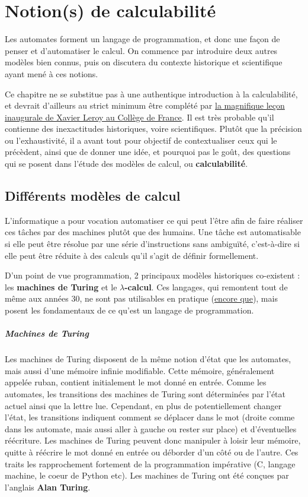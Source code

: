 
\chapter{Notion(s) de calculabilité}

Les automates forment un langage de programmation, et donc une façon de penser et d'automatiser le calcul. On commence par introduire deux autres modèles bien connus, puis on discutera du contexte historique et scientifique ayant mené à ces notions.

Ce chapitre ne se substitue pas à une authentique introduction à la calculabilité, et devrait d'ailleurs au strict minimum être complété par \href{https://www.college-de-france.fr/site/xavier-leroy/inaugural-lecture-2018-11-15-18h00.htm}{la magnifique leçon inaugurale de Xavier Leroy au Collège de France}. Il est très probable qu'il contienne des inexactitudes historiques, voire scientifiques. Plutôt que la précision ou l'exhaustivité, il a avant tout pour objectif de contextualiser ceux qui le précèdent, ainsi que de donner une idée, et pourquoi pas le goût, des questions qui se posent dans l'étude des modèles de calcul, ou \textbf{calculabilité}.

\section{Différents modèles de calcul}

L'informatique a pour vocation automatiser ce qui peut l'être afin de faire réaliser ces tâches par des machines plutôt que des humains. Une tâche est automatisable si elle peut être résolue par une série d'instructions sans ambiguïté, c'est-à-dire si elle peut être réduite à des calculs qu'il s'agit de définir formellement. 

D'un point de vue programmation, 2 principaux modèles historiques co-existent : les \textbf{machines de Turing} et le \textbf{$\lambda$-calcul}. Ces langages, qui remontent tout de même aux années 30, ne sont pas utilisables en pratique (\href{http://www.ens-lyon.fr/actualite/lecole/la-machine-de-turing-en-legos}{encore que}), mais posent les fondamentaux de ce qu'est un langage de programmation.

\paragraph{Machines de Turing} Les machines de Turing disposent de la même notion d'état que les automates, mais aussi d'une mémoire infinie modifiable. Cette mémoire, généralement appelée ruban, contient initialement le mot donné en entrée. Comme les automates, les transitions des machines de Turing sont déterminées par l'état actuel ainsi que la lettre lue. Cependant, en plus de potentiellement changer l'état, les transitions indiquent comment se déplacer dans le mot (droite comme dans les automate, mais aussi aller à gauche ou rester sur place) et d'éventuelles réécriture. Les machines de Turing peuvent donc manipuler à loisir leur mémoire, quitte à réécrire le mot donné en entrée ou déborder d'un côté ou de l'autre. Ces traits les rapprochement fortement de la programmation impérative (C, langage machine, le coeur de Python etc). Les machines de Turing ont été conçues par l'anglais \textbf{Alan Turing}.

